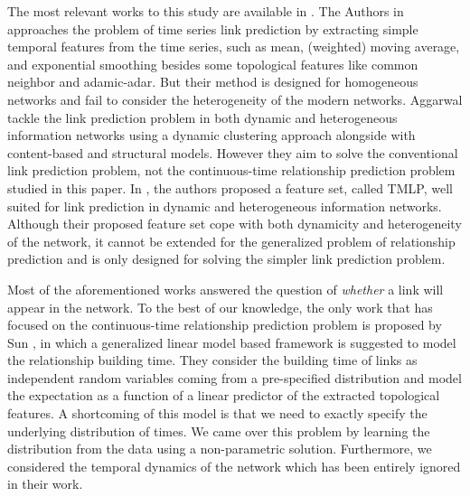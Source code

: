 The most relevant works to this study are available in \cite{hajibagheri2016leveraging, aggarwal2012dynamic, sett2017temporal, sun2012will}. The Authors in \cite{hajibagheri2016leveraging} approaches the problem of time series link prediction by extracting simple temporal features from the time series, such as mean, (weighted) moving average, and exponential smoothing besides some topological features like common neighbor and adamic-adar. But their method is designed for homogeneous networks and fail to consider the heterogeneity of the modern networks. Aggarwal \etal{} \cite{aggarwal2012dynamic} tackle the link prediction problem in both dynamic and heterogeneous information networks using a dynamic clustering approach alongside with content-based and structural models. However they aim to solve the conventional link prediction problem, not the continuous-time relationship prediction problem studied in this paper. In \cite{sett2017temporal}, the authors proposed a feature set, called TMLP, well suited for link prediction in dynamic and heterogeneous information networks. Although their proposed feature set cope with both dynamicity and heterogeneity of the network, it cannot be extended for the generalized problem of relationship prediction and is only designed for solving the simpler link prediction problem.

Most of the aforementioned works answered the question of \emph{whether} a link will appear in the network. To the best of our knowledge, the only work that has focused on the continuous-time relationship prediction problem is proposed by Sun \etal{} \cite{sun2012will}, in which a generalized linear model based framework is suggested to model the relationship building time. They consider the building time of links as independent random variables coming from a pre-specified distribution and model the expectation as a function of a linear predictor of the extracted topological features. A shortcoming of this model is that we need to exactly specify the underlying distribution of times. We came over this problem by learning the distribution from the data using a non-parametric solution. Furthermore, we considered the temporal dynamics of the network which has been entirely ignored in their work.

